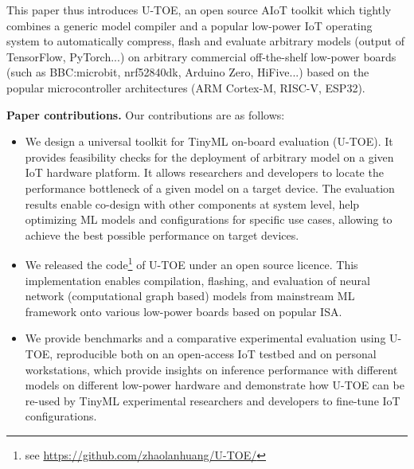 This paper thus introduces U-TOE, an open source AIoT toolkit which tightly combines a generic model compiler and a popular low-power IoT operating system to automatically compress, flash and evaluate arbitrary models (output of TensorFlow, PyTorch...) on arbitrary commercial off-the-shelf low-power boards (such as BBC:microbit, nrf52840dk, Arduino Zero, HiFive...) based on the popular microcontroller architectures (ARM Cortex-M, RISC-V, ESP32). 


{\bf Paper contributions.} Our contributions are as follows:
\begin{itemize}
    \item We design a universal toolkit for TinyML on-board evaluation (U-TOE). It provides feasibility checks for the deployment of arbitrary model on a given IoT hardware platform. It allows researchers and developers to locate the performance bottleneck of a given model on a target device. The evaluation results enable co-design with other components at system level, help optimizing ML models and configurations for specific use cases, allowing to achieve the best possible performance on target devices.
    
    \item We released the code\footnote{see \url{https://github.com/zhaolanhuang/U-TOE/}} of U-TOE under an open source licence. This implementation enables compilation, flashing, and evaluation of neural network (computational graph based) models from mainstream ML framework onto various low-power boards based on popular ISA.

    \item We provide benchmarks and a comparative experimental evaluation using U-TOE, reproducible both on an open-access IoT testbed and on personal workstations, which provide insights on inference performance with different models on different low-power hardware and
    demonstrate how U-TOE can be re-used by TinyML experimental researchers and developers to fine-tune IoT configurations. %
\end{itemize}